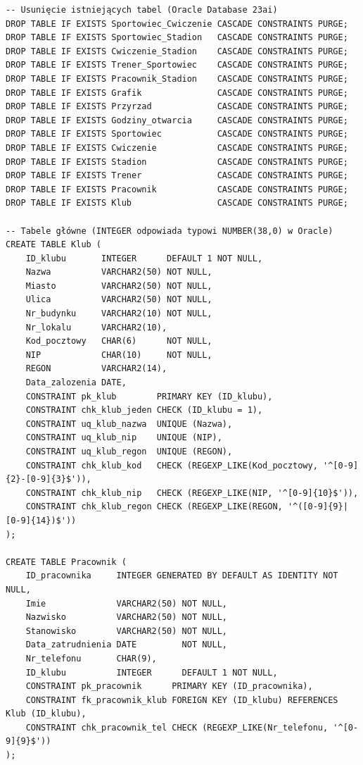 \documentclass[11pt,a4paper]{article}
\begin{document}
\begin{lstlisting}[basicstyle=\ttfamily\footnotesize, caption={Poprawiony skrypt SQL tworzący strukturę bazy danych}]
-- Usunięcie istniejących tabel (Oracle Database 23ai)
DROP TABLE IF EXISTS Sportowiec_Cwiczenie CASCADE CONSTRAINTS PURGE;
DROP TABLE IF EXISTS Sportowiec_Stadion   CASCADE CONSTRAINTS PURGE;
DROP TABLE IF EXISTS Cwiczenie_Stadion    CASCADE CONSTRAINTS PURGE;
DROP TABLE IF EXISTS Trener_Sportowiec    CASCADE CONSTRAINTS PURGE;
DROP TABLE IF EXISTS Pracownik_Stadion    CASCADE CONSTRAINTS PURGE;
DROP TABLE IF EXISTS Grafik               CASCADE CONSTRAINTS PURGE;
DROP TABLE IF EXISTS Przyrzad             CASCADE CONSTRAINTS PURGE;
DROP TABLE IF EXISTS Godziny_otwarcia     CASCADE CONSTRAINTS PURGE;
DROP TABLE IF EXISTS Sportowiec           CASCADE CONSTRAINTS PURGE;
DROP TABLE IF EXISTS Cwiczenie            CASCADE CONSTRAINTS PURGE;
DROP TABLE IF EXISTS Stadion              CASCADE CONSTRAINTS PURGE;
DROP TABLE IF EXISTS Trener               CASCADE CONSTRAINTS PURGE;
DROP TABLE IF EXISTS Pracownik            CASCADE CONSTRAINTS PURGE;
DROP TABLE IF EXISTS Klub                 CASCADE CONSTRAINTS PURGE;

-- Tabele główne (INTEGER odpowiada typowi NUMBER(38,0) w Oracle)
CREATE TABLE Klub (
    ID_klubu       INTEGER      DEFAULT 1 NOT NULL,
    Nazwa          VARCHAR2(50) NOT NULL,
    Miasto         VARCHAR2(50) NOT NULL,
    Ulica          VARCHAR2(50) NOT NULL,
    Nr_budynku     VARCHAR2(10) NOT NULL,
    Nr_lokalu      VARCHAR2(10),
    Kod_pocztowy   CHAR(6)      NOT NULL,
    NIP            CHAR(10)     NOT NULL,
    REGON          VARCHAR2(14),
    Data_zalozenia DATE,
    CONSTRAINT pk_klub        PRIMARY KEY (ID_klubu),
    CONSTRAINT chk_klub_jeden CHECK (ID_klubu = 1),
    CONSTRAINT uq_klub_nazwa  UNIQUE (Nazwa),
    CONSTRAINT uq_klub_nip    UNIQUE (NIP),
    CONSTRAINT uq_klub_regon  UNIQUE (REGON),
    CONSTRAINT chk_klub_kod   CHECK (REGEXP_LIKE(Kod_pocztowy, '^[0-9]{2}-[0-9]{3}$')),
    CONSTRAINT chk_klub_nip   CHECK (REGEXP_LIKE(NIP, '^[0-9]{10}$')),
    CONSTRAINT chk_klub_regon CHECK (REGEXP_LIKE(REGON, '^([0-9]{9}|[0-9]{14})$'))
);

CREATE TABLE Pracownik (
    ID_pracownika     INTEGER GENERATED BY DEFAULT AS IDENTITY NOT NULL,
    Imie              VARCHAR2(50) NOT NULL,
    Nazwisko          VARCHAR2(50) NOT NULL,
    Stanowisko        VARCHAR2(50) NOT NULL,
    Data_zatrudnienia DATE         NOT NULL,
    Nr_telefonu       CHAR(9),
    ID_klubu          INTEGER      DEFAULT 1 NOT NULL,
    CONSTRAINT pk_pracownik      PRIMARY KEY (ID_pracownika),
    CONSTRAINT fk_pracownik_klub FOREIGN KEY (ID_klubu) REFERENCES Klub (ID_klubu),
    CONSTRAINT chk_pracownik_tel CHECK (REGEXP_LIKE(Nr_telefonu, '^[0-9]{9}$'))
);


\end{lstlisting}
\end{document}
